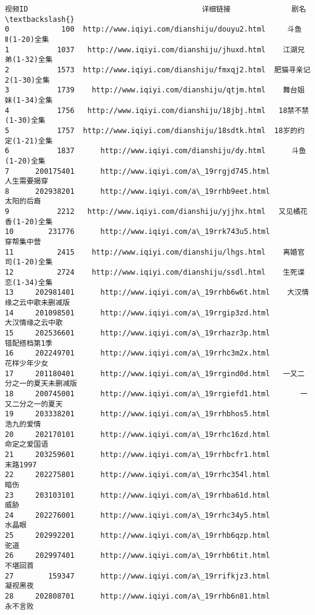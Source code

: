 \documentclass[11pt]{article}
\begin{document}
\begin{Verbatim}[commandchars=\\\{\}]
            视频ID                                        详细链接              剧名  \textbackslash{}
0            100  http://www.iqiyi.com/dianshiju/douyu2.html     斗鱼Ⅱ(1-20)全集   
1           1037   http://www.iqiyi.com/dianshiju/jhuxd.html    江湖兄弟(1-32)全集   
2           1573  http://www.iqiyi.com/dianshiju/fmxqj2.html  肥猫寻亲记2(1-30)全集   
3           1739    http://www.iqiyi.com/dianshiju/qtjm.html    舞台姐妹(1-34)全集   
4           1756   http://www.iqiyi.com/dianshiju/18jbj.html   18禁不禁(1-30)全集   
5           1757  http://www.iqiyi.com/dianshiju/18sdtk.html  18岁的约定(1-21)全集   
6           1837      http://www.iqiyi.com/dianshiju/dy.html      斗鱼(1-20)全集   
7      200175401      http://www.iqiyi.com/a\_19rrgjd745.html          人生需要揭穿   
8      202938201      http://www.iqiyi.com/a\_19rrhb9eet.html           太阳的后裔   
9           2212   http://www.iqiyi.com/dianshiju/yjjhx.html   又见橘花香(1-20)全集   
10        231776      http://www.iqiyi.com/a\_19rrk743u5.html           穿帮集中营   
11          2415    http://www.iqiyi.com/dianshiju/lhgs.html    离婚官司(1-20)全集   
12          2724    http://www.iqiyi.com/dianshiju/ssdl.html    生死谍恋(1-34)全集   
13     202981401      http://www.iqiyi.com/a\_19rrhb6w6t.html    大汉情缘之云中歌未删减版   
14     201098501      http://www.iqiyi.com/a\_19rrgip3zd.html        大汉情缘之云中歌   
15     202536601      http://www.iqiyi.com/a\_19rrhazr3p.html         错配搭档第1季   
16     202249701      http://www.iqiyi.com/a\_19rrhc3m2x.html          花样少年少女   
17     201180401      http://www.iqiyi.com/a\_19rrgind0d.html   一又二分之一的夏天未删减版   
18     200745001      http://www.iqiyi.com/a\_19rrgiefd1.html       一又二分之一的夏天   
19     203338201      http://www.iqiyi.com/a\_19rrhbhos5.html           浩九的爱情   
20     202170101      http://www.iqiyi.com/a\_19rrhc16zd.html          命定之爱国语   
21     203259601      http://www.iqiyi.com/a\_19rrhbcfr1.html          末路1997   
22     202275801      http://www.iqiyi.com/a\_19rrhc354l.html              暗伤   
23     203103101      http://www.iqiyi.com/a\_19rrhba61d.html              威胁   
24     202276001      http://www.iqiyi.com/a\_19rrhc34y5.html             水晶眼   
25     202992201      http://www.iqiyi.com/a\_19rrhb6qzp.html              驼道   
26     202997401      http://www.iqiyi.com/a\_19rrhb6tit.html            不堪回首   
27        159347      http://www.iqiyi.com/a\_19rrifkjz3.html            凝视黑夜   
28     202808701      http://www.iqiyi.com/a\_19rrhb6n81.html            永不言败   

\end{Verbatim}
\end{document}

